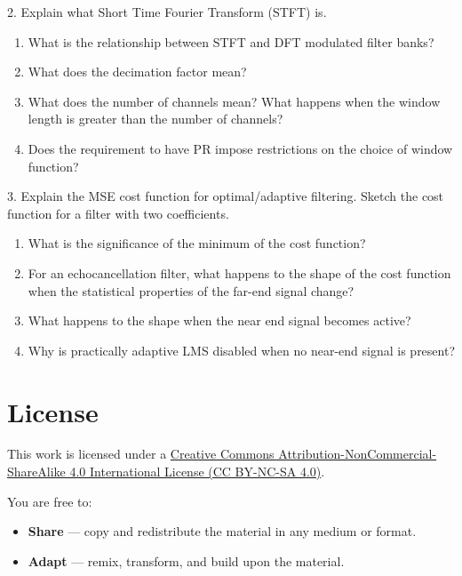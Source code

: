 \documentclass[
  a4paper,
  ,captions=tableheading
]{scrartcl}
\providecommand{\tightlist}{%
  \setlength{\itemsep}{0pt}\setlength{\parskip}{0pt}}
\begin{document}
2. Explain what Short Time Fourier Transform (STFT) is.

\begin{enumerate}
\def\labelenumi{\arabic{enumi}.}
\tightlist
\item
  What is the relationship between STFT and DFT modulated filter
  banks?\\
\item
  What does the decimation factor mean?\\
\item
  What does the number of channels mean? What happens when the window
  length is greater than the number of channels?\\
\item
  Does the requirement to have PR impose restrictions on the choice of
  window function?
\end{enumerate}

3. Explain the MSE cost function for optimal/adaptive filtering. Sketch
the cost function for a filter with two coefficients.

\begin{enumerate}
\def\labelenumi{\arabic{enumi}.}
\tightlist
\item
  What is the significance of the minimum of the cost function?\\
\item
  For an echocancellation filter, what happens to the shape of the cost
  function when the statistical properties of the far-end signal
  change?\\
\item
  What happens to the shape when the near end signal becomes active?\\
\item
  Why is practically adaptive LMS disabled when no near-end signal is
  present?
\end{enumerate}

\newpage

\section{License}\label{license}

This work is licensed under a
\href{https://creativecommons.org/licenses/by-nc-sa/4.0/}{Creative
Commons Attribution-NonCommercial-ShareAlike 4.0 International License
(CC BY-NC-SA 4.0)}.

You are free to:

\begin{itemize}
\tightlist
\item
  \textbf{Share} --- copy and redistribute the material in any medium or
  format.
\item
  \textbf{Adapt} --- remix, transform, and build upon the material.
\end{itemize}
\end{document}
